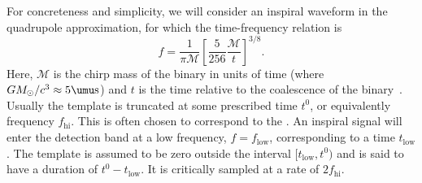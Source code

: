 For concreteness and simplicity, we will consider an inspiral waveform in the
quadrupole approximation, for which the time-frequency relation is
%
\begin{equation} \label{eq:fgw}
%
f = \frac{1}{\mathcal{\pi M}} \left[ \frac{5}{256}\frac{\mathcal{M}}{t}
\right]^{3/8}.
%
\end{equation}
%
Here, $\mathcal{M}$ is the chirp mass of the binary in units of time (where $G
M_\odot / c^3 \approx 5 \umu\mathrm{s}$) and $t$ is the time relative to the
coalescence of the binary~\cite{findchirppaper, kidder1992}.  Usually the
template is truncated at some prescribed time $t^0$, or equivalently frequency
$f_\textrm{hi}$.  This is often chosen to correspond to the \ISCO. An inspiral
signal will enter the detection band at a low frequency, $f = f_\mathrm{low}$,
corresponding to a time $t_\mathrm{low}$.  The template is assumed to be zero
outside the interval $[t_\mathrm{low}, t^0)$ and is said to have  a duration of
$t^0 - t_\mathrm{low}$. It is critically sampled at a rate of $2
f_\mathrm{hi}$.

